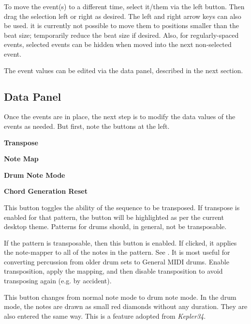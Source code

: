    To move the event(s) to a different time, select it/them via the left
   button.  Then drag the selection left or right as desired.
   The left and right arrow keys can also be used.
   it is currently not possible to move them to positions smaller than the
   beat size; temporarily reduce the beat size if desired.
   Also, for regularly-spaced events, selected events can be hidden when moved
   into the next non-selected event.

   The event values can be edited via the data panel, described in the next
   section.

\subsection{Data Panel}
\label{subsec:pattern_editor_data_view}

   Once the events are in place, the next step is to modify the
   data values of the events as needed.
   But first, note the buttons at the left.

   \begin{enumber}
      \item \textbf{Transpose}
      \item \textbf{Note Map}
      \item \textbf{Drum Note Mode}
      \item \textbf{Chord Generation Reset}
   \end{enumber}

   \setcounter{ItemCounter}{0}      %

   This button toggles the ability of the sequence to be transposed.
   If transpose is enabled for that pattern, the button will be highlighted as
   per the current desktop theme.  Patterns for drums should, in general, not
   be transposable.

   If the pattern is transposable, then this button is enabled.
   If clicked, it applies the note-mapper to all of the notes in the pattern.
   See .
   It is most useful for converting percussion from older drum sets to
   General MIDI drums.  Enable transposition, apply the mapping, and then
   disable transposition to avoid transposing again (e.g. by accident).

   This button changes from normal note mode to drum note mode. In the drum
   mode, the notes are drawn as small red diamonds without any duration.
   They are also entered the same way.
   This is a feature adopted from \textsl{Kepler34}.

